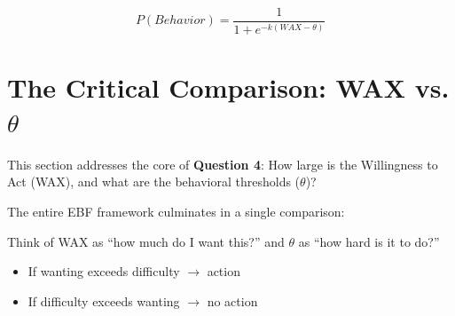 \begin{equation}
P(Behavior) = \frac{1}{1 + e^{-k(WAX - \theta)}}
\label{eq:behavior-probability}
\end{equation}





\section{The Critical Comparison: WAX vs. $\theta$}
\label{sec:wax-theta-comparison}

This section addresses the core of \textbf{Question 4}: How large is the Willingness to Act (WAX), and what are the behavioral thresholds ($\theta$)?

The entire EBF framework culminates in a single comparison:

\begin{center}
\end{center}

\begin{intuition}
Think of WAX as ``how much do I want this?'' and $\theta$ as ``how hard is it to do?''
\begin{itemize}
\item If wanting exceeds difficulty $\rightarrow$ action
\item If difficulty exceeds wanting $\rightarrow$ no action
\end{itemize}
\end{intuition}

